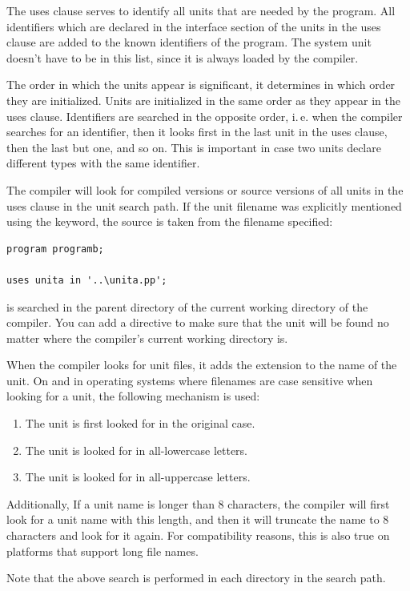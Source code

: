 The uses clause serves to identify all units that are needed by the program.
All identifiers which are declared in the interface section of the units
in the uses clause are added to the known identifiers of the program.
The system unit doesn't have to be in this list, since it is always loaded
by the compiler.

The order in which the units appear is significant, it determines in
which order they are initialized. Units are initialized in the same order
as they appear in the uses clause. Identifiers are searched in the opposite
order, i.\,e. when the compiler searches for an identifier, then it looks
first in the last unit in the uses clause, then the last but one, and so on.
This is important in case two units declare different types with the same
identifier.

The compiler will look for compiled versions or source versions of all
units in the uses clause in the unit search path. If the unit filename was
explicitly mentioned using the  keyword, the source is taken from
the filename specified:
\begin{verbatim}
program programb;

uses unita in '..\unita.pp';
\end{verbatim}
 is searched in the parent directory of the current working
directory of the compiler. You can add a  directive
to make sure that the unit will be found no matter where the compiler's
current working directory is.


When the compiler looks for unit files, it adds the extension 
to the name of the unit. On \linux and in operating systems where filenames
are case sensitive  when looking for a unit, the following mechanism is
used:
\begin{enumerate}
\item The unit is first looked for in the original case.
\item The unit is looked for in all-lowercase letters.
\item The unit is looked for in all-uppercase letters.
\end{enumerate}
Additionally, If a unit name is longer than 8 characters, the compiler
will first look for a unit name with this length, and then it will
truncate the name to 8 characters and look for it again.
For compatibility reasons, this is also true on platforms that
support long file names.

Note that the above search is performed in each directory in the search
path.

